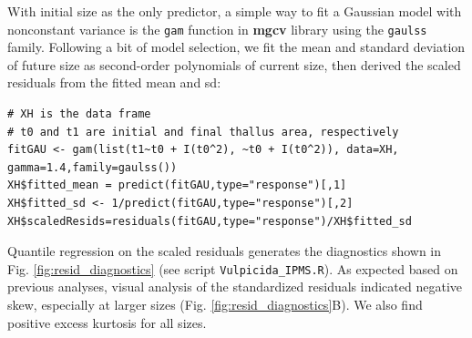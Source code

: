 \documentclass[12pt]{article}
\begin{document}
With initial size as the only predictor, a simple way to fit a Gaussian model with nonconstant variance is the \texttt{gam} function in \textbf{mgcv} library \citep{wood-2017} using the \texttt{gaulss} family. 
Following a bit of model selection, we fit the mean and standard deviation of future size as second-order polynomials of current size, then derived the scaled residuals from the fitted mean and sd:
\begin{lstlisting}
# XH is the data frame
# t0 and t1 are initial and final thallus area, respectively
fitGAU <- gam(list(t1~t0 + I(t0^2), ~t0 + I(t0^2)), data=XH, gamma=1.4,family=gaulss())
XH$fitted_mean = predict(fitGAU,type="response")[,1]
XH$fitted_sd <- 1/predict(fitGAU,type="response")[,2]
XH$scaledResids=residuals(fitGAU,type="response")/XH$fitted_sd
\end{lstlisting}
Quantile regression on the scaled residuals generates the diagnostics shown in Fig. \ref{fig:resid_diagnostics} (see script \texttt{Vulpicida\_IPMS.R}).
As expected based on previous analyses, visual analysis of the standardized residuals indicated negative skew, especially at larger sizes (Fig. \ref{fig:resid_diagnostics}B).
We also find positive excess kurtosis for all sizes. 
\end{document}
